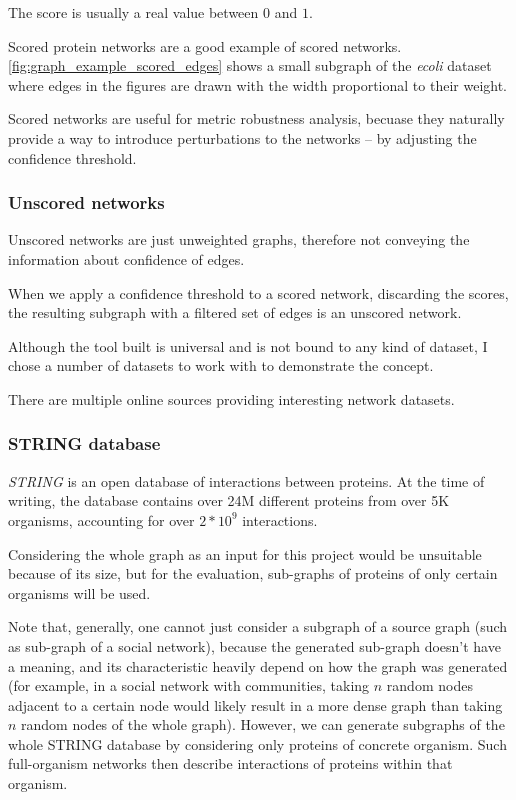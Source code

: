 The score is usually a real value between $0$ and $1$.



Scored protein networks are a good example of scored networks.
\autoref{fig:graph_example_scored_edges} shows a small subgraph of the \textsl{ecoli} dataset where edges in the figures are drawn with the width proportional to their weight.

Scored networks are useful for metric robustness analysis, becuase they naturally provide a way to introduce perturbations to the networks -- by adjusting the confidence threshold.

\subsubsection{Unscored networks}

Unscored networks are just unweighted graphs, therefore not conveying the information about confidence of edges.

When we apply a confidence threshold to a scored network, discarding the scores, the resulting subgraph with a filtered set of edges is an unscored network.

\parspace

Although the \graffs tool built is universal and is not bound to any kind of dataset, I chose a number of datasets to work with to demonstrate the concept.

There are multiple online sources providing interesting network datasets.

\subsubsection{STRING database}

\textit{STRING}\cite{Szklarczyk2019} is an open database of interactions between proteins.
At the time of writing, the database contains over 24M different proteins from over 5K organisms, accounting for over $2 * 10^9$ interactions.

Considering the whole graph as an input for this project would be unsuitable because of its size, but for the evaluation, sub-graphs of proteins of only certain organisms will be used.

Note that, generally, one cannot just consider a subgraph of a source graph (such as sub-graph of a social network), because the generated sub-graph doesn't have a meaning, and its characteristic heavily depend on how the graph was generated (for example, in a social network with communities, taking $n$ random nodes adjacent to a certain node would likely result in a more dense graph than taking $n$ random nodes of the whole graph).
However, we can generate subgraphs of the whole STRING database by considering only proteins of concrete organism.
Such full-organism networks then describe interactions of proteins within that organism.

